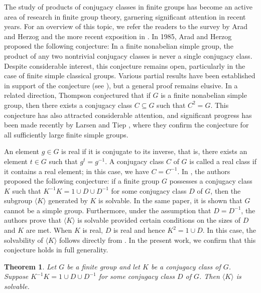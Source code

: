 \documentclass[twoside,a4paper,reqno,12pt]{amsart}
\newcommand{\<}{\langle}
\renewcommand{\>}{\rangle}
\newcommand{\la}{\langle}
\newcommand{\ra}{\rangle}
\renewcommand{\:}{\colon}
\newtheorem{thm}{Theorem}[section]
\theoremstyle{definition}
\begin{document}
The study of products of conjugacy classes in finite groups has become an active area of research in finite group theory, garnering significant attention in recent years. For an overview of this topic, we refer the readers to  the survey by Arad and Herzog \cite{AH} and the more recent exposition in \cite{BFM2}. In 1985, Arad and Herzog \cite{AH} proposed the following conjecture: In a finite nonabelian simple group, the product of any two nontrivial conjugacy classes is never a single conjugacy class.
Despite considerable interest, this conjecture remains open, particularly in the case of finite simple classical groups. Various partial results have been established in support of the conjecture (see \cite{AH,FA,MTong,GMT,GN}), but a general proof remains elusive.
In a related direction, Thompson conjectured that if $G$ is a finite nonabelian simple group, then there exists a conjugacy class $C\subseteq G$ such that $C^2=G$. This conjecture has also attracted considerable attention, and significant progress has been made recently by  Larsen and Tiep \cite{LT2, LT1}, where they confirm the conjecture for all sufficiently large finite simple groups.




An element $g\in G$ is real if it is conjugate to its inverse, that is, there exists an element $t\in G$ such that $g^t=g^{-1}$. A conjugacy class $C$ of $G$ is called a real class if it contains a real element; in this case, we have $C=C^{-1}.$ 
In \cite{BFM3}, the authors proposed the following conjecture:  if a finite group $G$ possesses a conjugacy class $K$  such that $K^{-1}K=1\cup D\cup D^{-1}$ for some conjugacy class $D$ of $G$, then the subgroup $\la K\ra$ generated by $K$ is solvable. In the same paper, it is shown that  $G$ cannot be a simple group. Furthermore, under the assumption that $D=D^{-1}$, the authors prove that  $\la K\ra$ is solvable provided certain conditions on the sizes of $D$ and $K$ are met. When $K$ is real,  $D$ is real and hence $K^2=1\cup D$. In this case, the solvability of $\la K\ra$ follows directly from \cite[Theorem A]{BFM4}. In the present work, we confirm that this conjecture holds in full generality.

\begin{thm}\label{th:3-classes}
Let $G$ be a finite group and let $K$ be a conjugacy class of $G$. Suppose $K^{-1}K=1\cup D\cup D^{-1}$ for some conjugacy class $D$ of $G$. Then $\la K\ra$ is solvable.
\end{thm}
\end{document}
